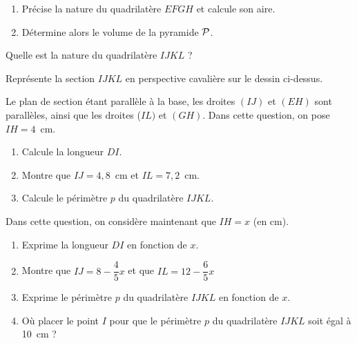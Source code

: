 \begin{myenumerate}
\item
\begin{enumerate}
\item Précise la nature du quadrilatère $EFGH$ et calcule son aire.
\item Détermine alors le volume de la pyramide $\cal P$.
\end{enumerate}
\item Quelle est la nature du quadrilatère $IJKL$ ?
\item Représente la section $IJKL$ en perspective cavalière sur le
dessin ci-dessus.
\item Le plan de section étant parallèle à la base, les droites $(IJ)$
et $(EH)$ sont parallèles, ainsi que les droites ($IL)$ et $(GH)$.
 Dans cette question, on pose $IH=4$~cm.
\begin{enumerate}
\item Calcule la longueur $DI$.
\item Montre que $IJ=4,8$~cm et $IL=7,2$~cm.
\item Calcule le périmètre $p$ du quadrilatère $IJKL$.
\end{enumerate}
\item Dans cette question, on considère maintenant que $IH=x$ (en
cm).
\begin{enumerate}
\item Exprime la longueur $DI$ en fonction de $x$.
\item Montre que $IJ=8-\dfrac45x$ et que $IL=12-\dfrac65x$
\item Exprime le périmètre $p$ du quadrilatère $IJKL$ en fonction de
$x$.
\item Où placer le point $I$ pour que le périmètre $p$ du quadrilatère
$IJKL$ soit égal à 10~cm ?
\end{enumerate}
\end{myenumerate}